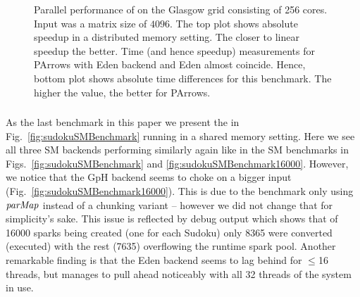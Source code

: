 \begin{figure}
\centering
%
{\label{subfig:speedupTorusDist}}%
{\label{subfig:performancetorusDistDiff}}
\caption{Parallel performance of \torustest on the Glasgow grid
  consisting of 256 cores. Input was a matrix size of $4096$. The top plot shows absolute speedup in a distributed memory setting. The
  closer to linear speedup the better. Time
  (and hence speedup) measurements for PArrows with Eden backend and
  Eden almost coincide. Hence, bottom plot shows
absolute time differences for this benchmark. The
higher the value, the better for PArrows.}
\label{fig:torusBenchmark}
\end{figure}


\subsubsection{\sudokutest}

As the last benchmark in this paper we present the \sudokutest in Fig.~\ref{fig:sudokuSMBenchmark} running in a shared memory setting. Here we see all three SM backends performing similarly again like in the \rmtest SM benchmarks in Figs.~\ref{fig:sudokuSMBenchmark} and \ref{fig:sudokuSMBenchmark16000}. However, we notice that the GpH backend seems to choke on a bigger input (Fig.~\ref{fig:sudokuSMBenchmark16000}). This is due to the benchmark only using \ensuremath{\Varid{parMap}} instead of a chunking variant -- however we did not change that for simplicity's sake. This issue is reflected by debug output which shows that of 16000 sparks being created (one for each Sudoku) only 8365 were converted (executed) with the rest (7635) overflowing the runtime spark pool. Another remarkable finding is that the Eden backend seems to lag behind for $\leq$16 threads, but manages to pull ahead noticeably with all 32 threads of the system in use.


\newcommand{\performanceSudokuSM}[1]{
\performanceplot{Parallel run time of \sudokutest \enquote{#1}}{linear speedup, Eden CP, GpH, \ensuremath{\Conid{Par}} Monad}{16}{4}{
\addplot [no markers,dotted,thick] table [scatter, x="nCores", y="time", col sep=comma, mark=none,
smooth] {benchmarks/sudoku-sm/bench-sudoku-sm.bench.fake-linear-sudoku-sudoku17.#1.txt.csv};
\addplot+ [very thick] table [scatter, x="nCores", y="time", col sep=comma, mark=none,
smooth]{benchmarks/sudoku-sm/bench-sudoku-sm.bench.parrows-sudoku-parmap-eden-sudoku17.#1.txt.csv};
\addplot+ [very thick] table [scatter, x="nCores", y="time", col sep=comma, mark=none,
smooth]{benchmarks/sudoku-sm/bench-sudoku-sm.bench.parrows-sudoku-parmap-mult-sudoku17.#1.txt.csv};
\addplot+ [very thick] table [scatter, x="nCores", y="time", col sep=comma, mark=none,
smooth]{benchmarks/sudoku-sm/bench-sudoku-sm.bench.parrows-sudoku-parmap-par-sudoku17.#1.txt.csv};
}{17}{\plotwidthSMP}
}

